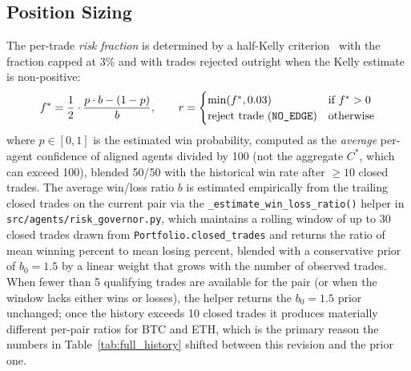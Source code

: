 \documentclass{article}
\begin{document}
\subsection{Position Sizing}

The per-trade \emph{risk fraction} is determined by a half-Kelly criterion~\citep{Kelly1956, Thorp2008Kelly} with the fraction capped at 3\% and with trades rejected outright when the Kelly estimate is non-positive:
\begin{equation}
  f^* = \frac{1}{2} \cdot \frac{p \cdot b - (1 - p)}{b}, \qquad
  r =
  \begin{cases}
    \min(f^*, 0.03) & \text{if } f^* > 0 \\
    \text{reject trade (\texttt{NO\_EDGE})} & \text{otherwise}
  \end{cases}
  \label{eq:kelly}
\end{equation}
where $p \in [0,1]$ is the estimated win probability, computed as the \emph{average} per-agent confidence of aligned agents divided by 100 (not the aggregate $C^*$, which can exceed 100), blended 50/50 with the historical win rate after $\geq 10$ closed trades.
The average win/loss ratio $b$ is estimated empirically from the trailing closed trades on the current pair via the \texttt{\_estimate\_win\_loss\_ratio()} helper in \texttt{src/agents/risk\_governor.py}, which maintains a rolling window of up to 30 closed trades drawn from \texttt{Portfolio.closed\_trades} and returns the ratio of mean winning percent to mean losing percent, blended with a conservative prior of $b_0 = 1.5$ by a linear weight that grows with the number of observed trades.
When fewer than 5 qualifying trades are available for the pair (or when the window lacks either wins or losses), the helper returns the $b_0 = 1.5$ prior unchanged; once the history exceeds 10 closed trades it produces materially different per-pair ratios for BTC and ETH, which is the primary reason the numbers in Table~\ref{tab:full_history} shifted between this revision and the prior one.
\end{document}
